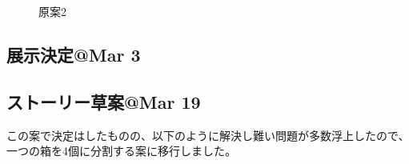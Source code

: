 \documentclass{jsarticle}
\begin{document}
\begin{figure}[h]
    \centering
    \caption{原案2}
    \label{figs:原案2}
\end{figure}

\clearpage

\subsection{展示決定@Mar 3}
\subsection{ストーリー草案@Mar 19}

\clearpage

この案で決定はしたものの、以下のように解決し難い問題が多数浮上したので、一つの箱を4個に分割する案に移行しました。
\end{document}
